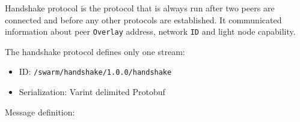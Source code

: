 
Handshake protocol is the protocol that is always run after two peers
are connected and before any other protocols are established. It
communicated information about peer \texttt{Overlay} address, network
\texttt{ID} and light node capability.


The handshake protocol defines only one stream:
\begin{itemize}
    \item ID: \texttt{/swarm/handshake/1.0.0/handshake} 
    \item Serialization: Varint delimited Protobuf
\end{itemize}

Message definition:
\begin{Shaded}
\begin{Highlighting}[]
\NormalTok{;}


    \NormalTok{;}
\NormalTok{\}}

\NormalTok{;}
    \NormalTok{;}
    \NormalTok{;}
    \NormalTok{;}
    \NormalTok{;}
\NormalTok{\}}

\NormalTok{;}
\NormalTok{;}
\NormalTok{\}}

    \NormalTok{;}
    \NormalTok{;}
    \NormalTok{;}
\NormalTok{\}}
\end{Highlighting}
\end{Shaded}


